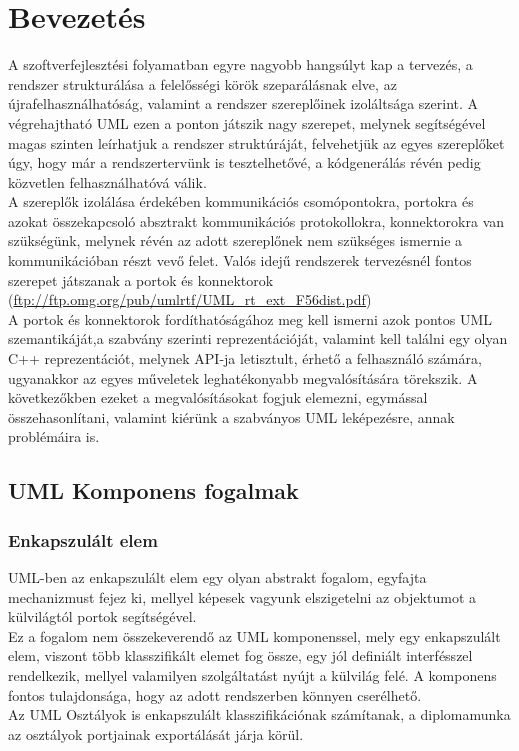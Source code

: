 \documentclass[a4paper,12pt]{report}
\begin{document}
\tableofcontents

\chapter{Bevezetés}
A szoftverfejlesztési folyamatban egyre nagyobb hangsúlyt kap a tervezés, a rendszer strukturálása a felelősségi körök szeparálásnak elve, az újrafelhasználhatóság, valamint a rendszer szereplőinek izoláltsága szerint. A végrehajtható UML ezen a ponton játszik nagy szerepet, melynek segítségével magas szinten leírhatjuk a rendszer struktúráját, felvehetjük az egyes szereplőket úgy, hogy már a rendszertervünk is tesztelhetővé, a kódgenerálás révén pedig közvetlen felhasználhatóvá válik. \\ A szereplők izolálása érdekében kommunikációs csomópontokra, portokra és azokat összekapcsoló absztrakt kommunikációs protokollokra, konnektorokra van szükségünk, melynek révén az adott szereplőnek nem szükséges ismernie a kommunikációban részt vevő felet. Valós idejű rendszerek tervezésnél fontos szerepet játszanak a portok és konnektorok (\url{ftp://ftp.omg.org/pub/umlrtf/UML_rt_ext_F56dist.pdf})\\ 
A portok és konnektorok fordíthatóságához meg kell ismerni azok pontos UML szemantikáját,a szabvány szerinti reprezentációját, valamint kell találni egy olyan C++ reprezentációt, melynek API-ja letisztult, érhető a felhasználó számára, ugyanakkor az egyes műveletek leghatékonyabb megvalósítására törekszik. A következőkben ezeket a megvalósításokat fogjuk elemezni, egymással összehasonlítani, valamint kiérünk a szabványos UML leképezésre, annak problémáira is. 

\section{UML Komponens fogalmak}
\subsection{Enkapszulált elem}
UML-ben az enkapszulált elem egy olyan abstrakt fogalom, egyfajta mechanizmust fejez ki, mellyel képesek vagyunk elszigetelni az objektumot a külvilágtól portok segítségével.\\ Ez a fogalom nem összekeverendő az UML komponenssel, mely egy enkapszulált elem, viszont több klasszifikált elemet fog össze, egy jól definiált interfésszel rendelkezik, mellyel valamilyen szolgáltatást nyújt a külvilág felé. A komponens fontos tulajdonsága, hogy az adott rendszerben könnyen cserélhető. \\
Az UML Osztályok is enkapszulált klasszifikációnak számítanak, a diplomamunka az osztályok portjainak exportálását járja körül.
\end{document}
